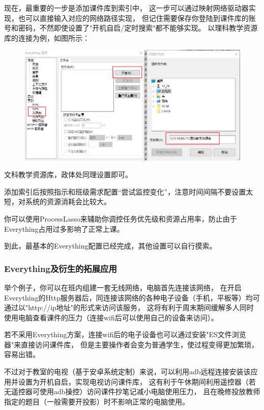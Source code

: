 \documentclass{article}
\begin{document}
            现在，最重要的一步是添加课件库到索引中，
            这一步可以通过映射网络驱动器实现，也可以直接输入对应的网络路径实现，
            但记住需要保存你登陆到课件库的账号和密码，不然即使设置了"开机自启/定时搜索"都不能够实现。
            以理科教学资源库的连接为例，如图所示：

            \begin{figure}[htbp]
            \centering
            \includegraphics[scale=0.5]{2.1-p3.png}
            \end{figure}

            文科教学资源库，政体处同理设置即可。

            添加索引后按照指示和班级需求配置“尝试监控变化”，注意时间间隔不要设置太短，对系统的资源消耗会比较大。

            你可以使用ProcessLasso来辅助你调控任务优先级和资源占用率，防止由于Everything占用过多影响了正常上课。

            到此，最基本的Everything配置已经完成，其他设置可以自行摸索。
            
        \subsubsection{Everything及衍生的拓展应用}
        举个例子，你可以在班内组建一套无线网络，电脑首先连接该网络，
        在开启Everything的Http服务器后，同连接该网络的各种电子设备（手机，平板等）均可通过以"http://ip地址"的形式来访问该服务，
        这将有利于周末期间缓解多人同时使用电脑查看课件的压力（连接wifi后可以使用自己的设备来访问）。
        
        若不采用Everything方案，连接wifi后的电子设备也可以通过安装"ES文件浏览器"来直接访问课件库，
        但是主要操作者会变为普通学生，使过程变得更加繁琐，容易出错。
        
        不过对于教室的电视（基于安卓系统定制）来说，可以利用adb远程连接安装该应用并设置为开机自启，实现电视访问课件库，
        这有利于午休期间利用遥控器（若无遥控器可使用adb操控）访问课件抄笔记减小电脑使用压力，
        且在晚修投放教师指定的题目（一般需要开投影）时不影响正常的电脑使用。
\end{document}

